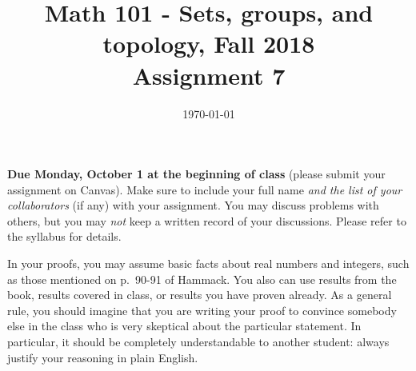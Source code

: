 \documentclass{amsart}
\title[Math 101, Fall 2018: assignment 7]{Math 101 - Sets, groups, and topology, Fall 2018 \\ Assignment 7}
\date{\today}
\theoremstyle{definition}
\begin{document}

\maketitle

\textbf{Due Monday, October 1 at the beginning of class} (please submit your assignment on Canvas). Make sure to include your full name \emph{and the list of your collaborators} (if any) with your assignment. You may discuss problems with others, but you may \emph{not} keep a written record of your discussions. Please refer to the syllabus for details.

In your proofs, you may assume basic facts about real numbers and integers, such as those mentioned on p.~90-91 of Hammack. You also can use results from the book, results covered in class, or results you have proven already. As a general rule, you should imagine that you are writing your proof to convince somebody else in the class who is very skeptical about the particular statement. In particular, it should be completely understandable to another student: always justify your reasoning in plain English. 
\end{document}
